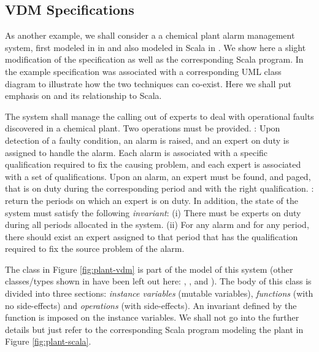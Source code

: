 \subsection{VDM Specifications}
\label{sec:vdm-in-scala}

As another example, we shall consider a a chemical plant alarm management system, first modeled in \vdmpp{} in \cite{vdmplusplus05} and also modeled in Scala in 
\cite{?}. We show here a slight modification of 
the \vdmpp{} specification as well as the 
corresponding Scala program. In \cite{vdmplusplus05}
the example specification was associated with 
a corresponding UML class diagram to illustrate how the two
techniques can co-exist. Here we shall put emphasis on
\vdmpp{} and its relationship to Scala.

The system shall manage the calling out of experts to deal with 
operational faults discovered in a 
chemical plant. 
Two operations must be provided.
: Upon detection of a faulty condition, an alarm is raised, and an expert on duty is assigned to
handle the alarm. Each alarm is associated with a specific 
qualification required to fix the causing
problem, and each expert is associated with a set of 
qualifications. Upon an alarm, an expert must be found, and paged, 
that is on duty during the corresponding period and with the right qualification.    
: return the periods on which an expert is on duty.      
In addition, the state of the system must satisfy the following
{\em invariant}:
(i) There must be experts on duty during all periods 
allocated in the system. 
(ii) For any alarm and for any period, there should exist an expert assigned to that period that has the qualification required
to fix the source problem of the alarm.

The \vdmpp{} class  in Figure \ref{fig:plant-vdm} 
is part of the model of this system (other classes/types shown in
\cite{vdmplusplus05} have been left out here: 
, , and ).
The body of this class is divided into three sections: {\em instance variables} (mutable variables), {\em functions} (with no side-effects) and {\em operations} (with side-effects). An invariant defined by the function  is imposed on the instance variables. We shall not go into the further details
but just refer to the corresponding Scala program modeling the plant in Figure \ref{fig:plant-scala}.

